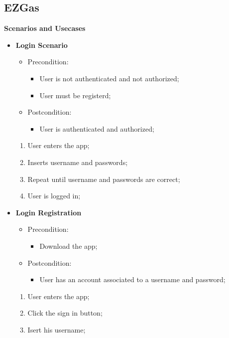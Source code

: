 \documentclass[12pt]{article}
\begin{document}
\subsection{EZGas}
\textbf{Scenarios and Usecases}
\begin{itemize}
  \item \textbf{Login Scenario}
    \begin{itemize}
      \item Precondition:
        \begin{itemize}
          \item User is not authenticated and not authorized;
          \item User must be registerd;
        \end{itemize}
      \item Postcondition:
        \begin{itemize}
          \item User is authenticated and authorized;
        \end{itemize}
    \end{itemize}
    \begin{enumerate}
      \item User enters the app;
      \item Inserts username and passwords;
      \item Repeat until username and passwords are correct;
      \item User is logged in;
    \end{enumerate}
  \item \textbf{Login Registration}
    \begin{itemize}
      \item Precondition:
        \begin{itemize}
          \item Download the app;
        \end{itemize}
      \item Postcondition:
        \begin{itemize}
          \item User has an account associated to a username and password;
        \end{itemize}
    \end{itemize}
    \begin{enumerate}
      \item User enters the app;
      \item Click the sign in button;
      \item Isert his username;

\end{enumerate}
\end{itemize}
\end{document}
